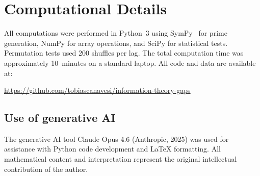 \documentclass[11pt, a4paper]{amsart}
\theoremstyle{plain}
\theoremstyle{definition}
\begin{document}
\section{Computational Details}
\label{sec:computation}

All computations were performed in Python~3 using SymPy~\cite{SymPy} for prime generation, NumPy for array operations, and SciPy for statistical tests. Permutation tests used $200$ shuffles per lag. The total computation time was approximately 10~minutes on a standard laptop. All code and data are available at:

\begin{center}
\url{https://github.com/tobiascanavesi/information-theory-gaps}
\end{center}

\subsection*{Use of generative AI}
The generative AI tool Claude Opus 4.6 (Anthropic, 2025) was used for assistance with Python code development and \LaTeX{} formatting. All mathematical content and interpretation represent the original intellectual contribution of the author.


\end{document}
